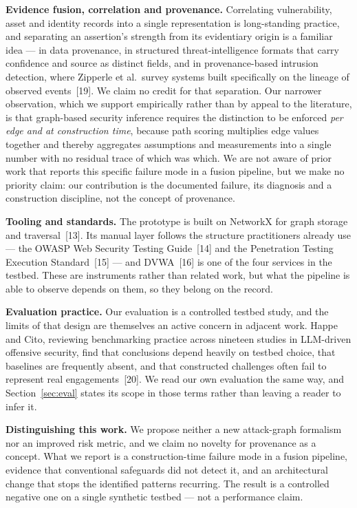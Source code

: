 \documentclass[11pt,a4paper]{article}
\begin{document}
\textbf{Evidence fusion, correlation and provenance.} Correlating vulnerability, asset and identity records into a single representation is long-standing practice, and separating an assertion's strength from its evidentiary origin is a familiar idea --- in data provenance, in structured threat-intelligence formats that carry confidence and source as distinct fields, and in provenance-based intrusion detection, where Zipperle et al.\ survey systems built specifically on the lineage of observed events~[19]. We claim no credit for that separation. Our narrower observation, which we support empirically rather than by appeal to the literature, is that graph-based security inference requires the distinction to be enforced \emph{per edge and at construction time}, because path scoring multiplies edge values together and thereby aggregates assumptions and measurements into a single number with no residual trace of which was which. We are not aware of prior work that reports this specific failure mode in a fusion pipeline, but we make no priority claim: our contribution is the documented failure, its diagnosis and a construction discipline, not the concept of provenance.

\textbf{Tooling and standards.} The prototype is built on NetworkX for graph storage and traversal~[13]. Its manual layer follows the structure practitioners already use --- the OWASP Web Security Testing Guide~[14] and the Penetration Testing Execution Standard~[15] --- and DVWA~[16] is one of the four services in the testbed. These are instruments rather than related work, but what the pipeline is able to observe depends on them, so they belong on the record.

\textbf{Evaluation practice.} Our evaluation is a controlled testbed study, and the limits of that design are themselves an active concern in adjacent work. Happe and Cito, reviewing benchmarking practice across nineteen studies in LLM-driven offensive security, find that conclusions depend heavily on testbed choice, that baselines are frequently absent, and that constructed challenges often fail to represent real engagements~[20]. We read our own evaluation the same way, and Section~\ref{sec:eval} states its scope in those terms rather than leaving a reader to infer it.

\textbf{Distinguishing this work.} We propose neither a new attack-graph formalism nor an improved risk metric, and we claim no novelty for provenance as a concept. What we report is a construction-time failure mode in a fusion pipeline, evidence that conventional safeguards did not detect it, and an architectural change that stops the identified patterns recurring. The result is a controlled negative one on a single synthetic testbed --- not a performance claim.
\end{document}
